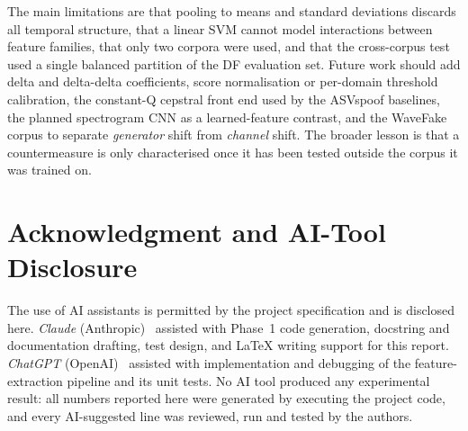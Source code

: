 \documentclass[journal,10pt]{IEEEtran}
\begin{document}
The main limitations are that pooling to means and standard deviations
discards all temporal structure, that a linear SVM cannot model interactions
between feature families, that only two corpora were used, and that the
cross-corpus test used a single balanced partition of the DF evaluation set.
Future work should add delta and delta-delta coefficients, score
normalisation or per-domain threshold calibration, the constant-Q cepstral
front end used by the ASVspoof baselines, the planned spectrogram CNN as a
learned-feature contrast, and the WaveFake corpus to separate
\emph{generator} shift from \emph{channel} shift. The broader lesson is that
a countermeasure is only characterised once it has been tested outside the
corpus it was trained on.

\section*{Acknowledgment and AI-Tool Disclosure}
The use of AI assistants is permitted by the project specification and is
disclosed here. \emph{Claude} (Anthropic)~\cite{claude} assisted with
Phase~1 code generation, docstring and documentation drafting, test design,
and \LaTeX{} writing support for this report. \emph{ChatGPT}
(OpenAI)~\cite{chatgpt} assisted with implementation and debugging of the
feature-extraction pipeline and its unit tests. No AI tool produced any
experimental result: all numbers reported here were generated by executing
the project code, and every AI-suggested line was reviewed, run and tested
by the authors.
\end{document}

